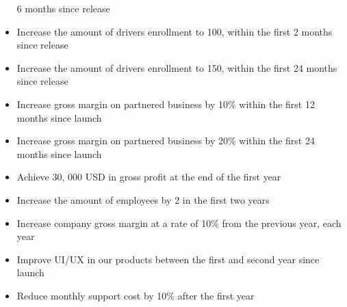 \begin{itemize}
    6 months since release
    \item Increase the amount of drivers enrollment to 100, within the first 
    2 months since release
    \pagebreak
    \item Increase the amount of drivers enrollment to 150, within the first 
    24 months since release
    \item Increase gross margin on partnered business by 10\% within the 
    first 12 months since launch
    \item Increase gross margin on partnered business by 20\% within the 
    first 24 months since launch
    \item Achieve 30, 000 USD in gross profit at the end of the first year
    \item Increase the amount of employees by 2 in the first two years
    \item Increase company gross margin at a rate of 10\% from the previous 
    year, each year
    \item Improve UI/UX in our products between the first and second year 
    since launch
    \item Reduce monthly support cost by 10\% after the first year
\end{itemize}